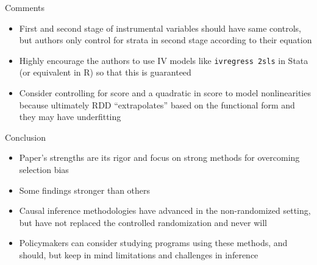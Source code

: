 \documentclass{beamer}
\begin{document}
\begin{frame}{Comments}

\begin{itemize}
\item First and second stage of instrumental variables should have same controls, but authors only control for strata in second stage according to their equation
\item Highly encourage the authors to use IV models like \texttt{ivregress 2sls} in Stata (or equivalent in R) so that this is guaranteed
\item Consider controlling for score and a quadratic in score to model nonlinearities because ultimately RDD ``extrapolates'' based on the functional form and they may have underfitting
\end{itemize}

\end{frame}


\begin{frame}{Conclusion}

\begin{itemize}
\item Paper's strengths are its rigor and focus on strong methods for overcoming selection bias
\item Some findings stronger than others
\item Causal inference methodologies have advanced in the non-randomized setting, but have not replaced the controlled randomization and never will
\item Policymakers can consider studying programs using these methods, and should, but keep in mind limitations and challenges in inference
\end{itemize}

\end{frame}

\end{document}
